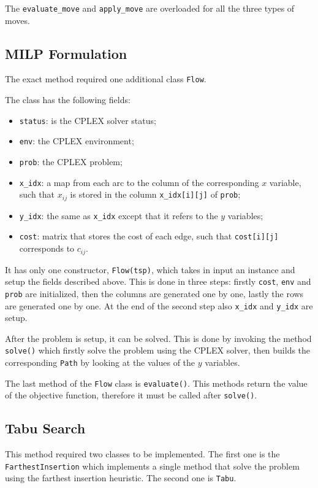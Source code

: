 \documentclass{article}
\begin{document}
The \texttt{evaluate\_move} and \texttt{apply\_move} are overloaded for all the three types of moves.

\subsection{MILP Formulation}
The exact method required one additional class \texttt{Flow}.

The class has the following fields:
\begin{itemize}
    \item \texttt{status}: is the CPLEX solver status;
    \item \texttt{env}: the CPLEX environment;
    \item \texttt{prob}: the CPLEX problem;
    \item \texttt{x\_idx}: a map from each arc to the column of the corresponding $x$ variable, such that $x_{i j}$ is stored in the column \texttt{x\_idx[i][j]} of \texttt{prob};
    \item \texttt{y\_idx}: the same as \texttt{x\_idx} except that it refers to the $y$ variables;
    \item \texttt{cost}: matrix that stores the cost of each edge, such that \texttt{cost[i][j]} corresponds to $c_{i j}$.
\end{itemize}

It has only one constructor, \texttt{Flow(tsp)}, which takes in input an instance and setup the fields described above.
This is done in three steps: firstly \texttt{cost}, \texttt{env} and \texttt{prob} are initialized, then the columns are generated one by one, lastly the rows are generated one by one.
At the end of the second step also \texttt{x\_idx} and \texttt{y\_idx} are setup.

After the problem is setup, it can be solved.
This is done by invoking the method \texttt{solve()} which firstly solve the problem using the CPLEX solver, then builds the corresponding \texttt{Path} by looking at the values of the $y$ variables.

The last method of the \texttt{Flow} class is \texttt{evaluate()}.
This methods return the value of the objective function, therefore it must be called after \texttt{solve()}.

\subsection{Tabu Search}
This method required two classes to be implemented.
The first one is the \texttt{FarthestInsertion} which implements a single method that solve the problem using the farthest insertion heuristic.
The second one is \texttt{Tabu}.
\end{document}

